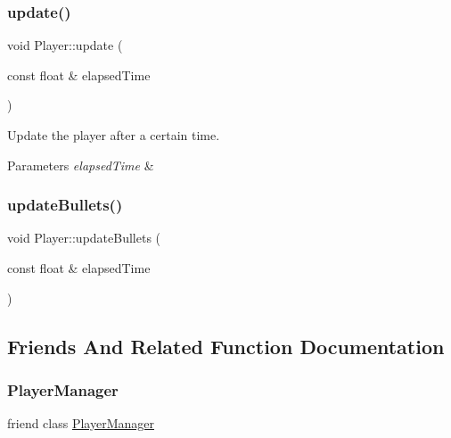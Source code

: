 \subsubsection{\texorpdfstring{update()}{update()}}
{\footnotesize\ttfamily void Player\+::update (\begin{DoxyParamCaption}\item[{const float \&}]{elapsed\+Time }\end{DoxyParamCaption})}



Update the player after a certain time. 


\begin{DoxyParams}{Parameters}
{\em elapsed\+Time} & \\
\hline
\end{DoxyParams}
\mbox{\label{class_player_a66534b1473c5f9288ae8cd7001738ff9}} 
\subsubsection{\texorpdfstring{update\+Bullets()}{updateBullets()}}
{\footnotesize\ttfamily void Player\+::update\+Bullets (\begin{DoxyParamCaption}\item[{const float \&}]{elapsed\+Time }\end{DoxyParamCaption})\hspace{0.3cm}{\ttfamily [private]}}



\subsection{Friends And Related Function Documentation}
\mbox{\label{class_player_af4dd6083207676104071a0b097ff2bff}} 
\subsubsection{\texorpdfstring{Player\+Manager}{PlayerManager}}
{\footnotesize\ttfamily friend class \hyperlink{class_player_manager}{Player\+Manager}\hspace{0.3cm}{\ttfamily [friend]}}



